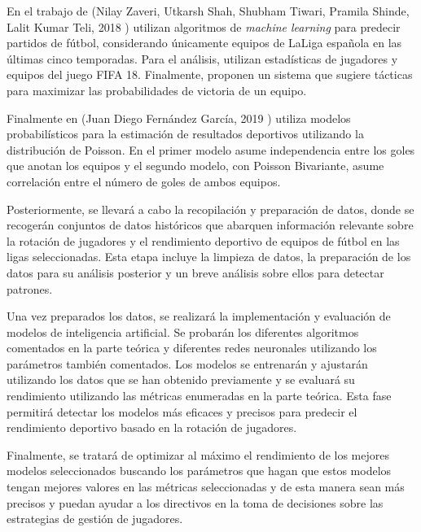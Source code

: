 En el trabajo de (Nilay Zaveri, Utkarsh Shah, Shubham Tiwari, Pramila Shinde, Lalit Kumar Teli, 2018 \cite{indios}) utilizan algoritmos de \textit{machine learning} para predecir partidos de fútbol, considerando únicamente equipos de LaLiga española en las últimas cinco temporadas. Para el análisis, utilizan estadísticas de jugadores y equipos del juego FIFA 18. Finalmente, proponen un sistema que sugiere tácticas para maximizar las probabilidades de victoria de un equipo.

Finalmente en (Juan Diego Fernández García, 2019 \cite{tfg-laguna}) utiliza modelos probabilísticos para la estimación de resultados deportivos utilizando la distribución de Poisson. En el primer modelo asume independencia entre los goles que anotan los equipos y el segundo modelo, con Poisson Bivariante, asume correlación entre el número de goles de ambos equipos.



Posteriormente, se llevará a cabo la recopilación y preparación de datos, donde se recogerán conjuntos de datos históricos que abarquen información relevante sobre la rotación de jugadores y el rendimiento deportivo de equipos de fútbol en las ligas seleccionadas. Esta etapa incluye la limpieza de datos, la preparación de los datos para su análisis posterior y un breve análisis sobre ellos para detectar patrones.

Una vez preparados los datos, se realizará la implementación y evaluación de modelos de inteligencia artificial. Se probarán los diferentes algoritmos comentados en la parte teórica y diferentes redes neuronales utilizando los parámetros también comentados. Los modelos se entrenarán y ajustarán utilizando los datos que se han obtenido previamente y se evaluará su rendimiento utilizando las métricas enumeradas en la parte teórica. Esta fase permitirá detectar los modelos más eficaces y precisos para predecir el rendimiento deportivo basado en la rotación de jugadores.

Finalmente, se tratará de optimizar al máximo el rendimiento de los mejores modelos seleccionados buscando los parámetros que hagan que estos modelos tengan mejores valores en las métricas seleccionadas y de esta manera sean más precisos y puedan ayudar a los directivos en la toma de decisiones sobre las estrategias de gestión de jugadores.


